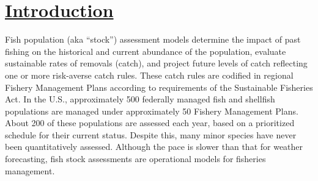 \hypertarget{intro}{}
\section{\hyperlink{intro}{Introduction}}

Fish population (aka ``stock'') assessment models determine the impact of past fishing on the historical and current abundance of the population, evaluate sustainable rates of removals (catch), and project future levels of catch reflecting one or more risk-averse catch rules. These catch rules are codified in regional Fishery Management Plans according to requirements of the Sustainable Fisheries Act. In the U.S., approximately 500 federally managed fish and shellfish populations are managed under approximately 50 Fishery Management Plans. About 200 of these populations are assessed each year, based on a prioritized schedule for their current status. Despite this, many minor species have never been quantitatively assessed. Although the pace is slower than that for weather forecasting, fish stock assessments are operational models for fisheries management.



